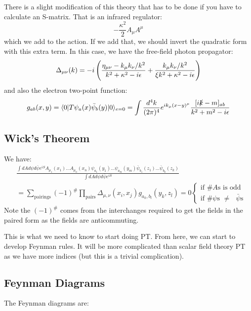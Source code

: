 There is a slight modification of this theory that has to be done if you have to calculate an S-matrix. That is an infrared regulator:
\begin{equation}
    -\frac{\kappa^2}{2}A_\mu A^\mu
\end{equation}
which we add to the action. If we add that, we should invert the quadratic form with this extra term. In this case, we have the free-field photon propagator:
\begin{equation}
    \Delta_{\mu\nu}(k) = -i\left(\frac{\eta_{\mu\nu} - k_\mu k_\nu / k^2}{k^2 + \kappa^2 - i\epsilon} + \frac{k_\mu k_\nu /k^2}{\xi k^2 + \kappa^2 - i\epsilon}\right)
\end{equation}
and also the electron two-point function:
\begin{equation}
    g_{ab}(x, y) = \langle 0 \rvert T\psi_a(x)\bar{\psi}_b(y)\lvert 0 \rangle_{e=0} = \int \frac{d^4k}{(2\pi)^4} e^{ik_\mu (x - y)^\mu} \frac{[i\slashed{k} - m]_{ab}}{k^2 + m^2 - i\epsilon}
\end{equation}

\subsection{Wick's Theorem}
We have:
\begin{equation}
    \begin{split}
        &\frac{\int dAd\psi d\bar{\psi} e^{iS} A_{\mu_1}(x_1) \ldots A_{\mu_n}(x_n)\psi_{a_1}(y_1) \ldots \psi_{a_m}(y_m) \bar{\psi}_{b_1}(z_1) \ldots \bar{\psi}_{b_k}(z_k)}{\int dA d\psi d\bar{\psi} e^{iS}} 
        \\ &= \sum_{\text{pairings}} (-1)^{\#} \prod_{\text{pairs}}\Delta_{\mu, \nu}(x_i, x_j) g_{a_k, b_l}(y_k, z_l) = 0 \begin{cases}
            \text{if \# $A$s is odd}
            \\ \text{if \# $\psi$s $\neq$ $\bar{\psi}$s}
        \end{cases}
    \end{split}
\end{equation}
Note the $(-1)^{\#}$ comes from the interchanges required to get the fields in the paired form as the fields are anticommuting.

This is what we need to know to start doing PT. From here, we can start to develop Feynman rules. It will be more complicated than scalar field theory PT as we have more indices (but this is a trivial complication).

\subsection{Feynman Diagrams}
The Feynman diagrams are:

